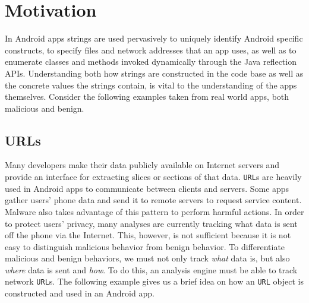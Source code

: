 \section{Motivation}
\label{sec:motivation}

In Android apps strings are used pervasively to uniquely identify Android specific constructs, to specify files and network addresses
that an app uses, as well as to enumerate classes and methods invoked dynamically through the
Java reflection APIs. Understanding both how strings are constructed in the code base as well as the concrete values the strings contain, is vital to
the understanding of the apps themselves. Consider the following examples taken
from real world apps, both malicious and benign.


  


\subsection{URLs}
Many developers make their data publicly available on Internet servers and provide an interface for extracting slices or sections of that data.
\texttt{URL}s are heavily used in Android apps to communicate between clients and servers. Some apps gather users' phone data and send it
to remote servers to request service content. Malware also takes advantage of this pattern to perform harmful actions.
In order to protect users' privacy, many analyses are currently tracking what data is sent off the phone via the Internet.
This, however, is not sufficient because it is not easy to distinguish malicious behavior from benign behavior. To differentiate malicious and
benign behaviors, we must not only track {\em what} data is, but also {\em where} data is sent and {\em how}.
To do this, an analysis engine must be able to track network \texttt{URL}s.
The following example gives us a brief idea on how an \texttt{URL} object is
constructed and used in an Android app.\\

